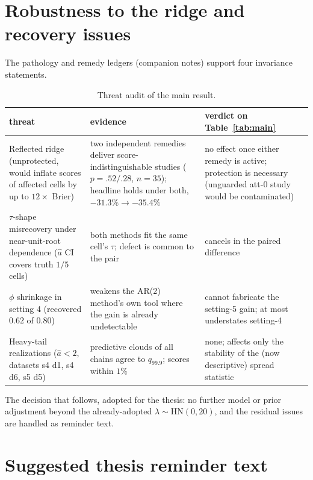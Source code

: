 \documentclass[11pt]{article}
\begin{document}
\section{Robustness to the ridge and recovery issues}

The pathology and remedy ledgers (companion notes) support four
invariance statements.

\begin{table}[ht]
\centering
\caption{Threat audit of the main result.}
\label{tab:threats}
\small
\begin{tabular}{p{}p{}p{}}
\toprule
threat & evidence & verdict on Table~\ref{tab:main} \\
\midrule
Reflected ridge (unprotected, would inflate scores of affected cells by
up to $12\times$ Brier) &
two independent remedies deliver score-indistinguishable studies
($p=.52/.28$, $n=35$); headline holds under both, $-31.3\% \to -35.4\%$ &
no effect once either remedy is active; protection is necessary
(unguarded att-0 study would be contaminated) \\
\addlinespace
$\tau$-shape misrecovery under near-unit-root dependence
($\hat a$ CI covers truth $1/5$ cells) &
both methods fit the same cell's $\tau$; defect is common to the pair &
cancels in the paired difference \\
\addlinespace
$\phi$ shrinkage in setting 4 (recovered $0.62$ of $0.80$) &
weakens the AR(2) method's own tool where the gain is already
undetectable &
cannot fabricate the setting-5 gain; at most understates setting-4 \\
\addlinespace
Heavy-tail realizations ($\hat a < 2$, datasets s4 d1, s4 d6, s5 d5) &
predictive clouds of all chains agree to $q_{99.9}$; scores within
$1\%$ &
none; affects only the stability of the (now descriptive) spread
statistic \\
\bottomrule
\end{tabular}
\end{table}

The decision that follows, adopted for the thesis: no further model or
prior adjustment beyond the already-adopted
$\lambda \sim \mathrm{HN}(0,20)$, and the residual issues are handled as
reminder text.

\section{Suggested thesis reminder text}
\end{document}
